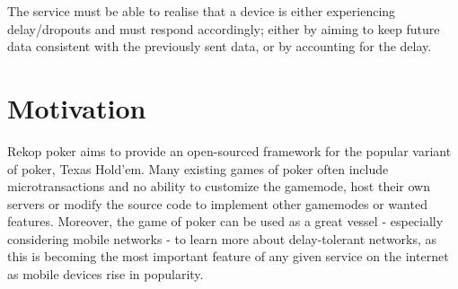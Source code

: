 \documentclass[11pt]{article}
\begin{document}
The service must be able to realise that a device is either experiencing delay/dropouts and must respond accordingly; either by aiming to keep future data consistent with the previously sent data, or by accounting for the delay. \\





\section{Motivation}

Rekop poker aims to provide an open-sourced framework for the popular variant of poker, Texas Hold'em. Many existing games of poker often include microtransactions and no ability to customize the gamemode, host their own servers or modify the source code to implement other gamemodes or wanted features. Moreover, the game of poker can be used as a great vessel - especially considering mobile networks - to learn more about delay-tolerant networks, as this is becoming the most important feature of any given service on the internet as mobile devices rise in popularity. 
\end{document}
